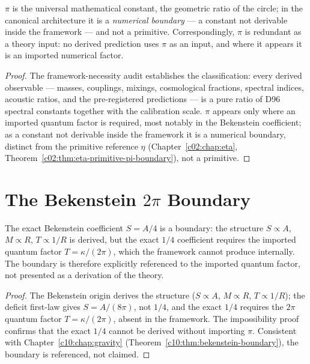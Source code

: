 \begin{theorem}
\label{c13:thm:pi-redundant}
\emph{$\pi$} is the universal mathematical constant, the geometric ratio of the circle; in
the canonical architecture it is a \emph{numerical boundary} --- a constant not derivable
inside the framework --- and not a primitive. Correspondingly, $\pi$ is redundant as a
theory input: no derived prediction uses $\pi$ as an input, and where it appears it is an
imported numerical factor.
\end{theorem}

\begin{proof}
The framework-necessity audit \cite{c13:QG291} establishes the classification: every derived
observable --- masses, couplings, mixings, cosmological fractions, spectral indices,
acoustic ratios, and the pre-registered predictions --- is a pure ratio of D96 spectral
constants together with the calibration scale. $\pi$ appears only where an imported quantum
factor is required, most notably in the Bekenstein coefficient; as a constant not derivable
inside the framework it is a numerical boundary, distinct from the primitive reference
$\eta$ (Chapter~\ref{c02:chap:eta}, Theorem~\ref{c02:thm:eta-primitive-pi-boundary}), not a
primitive.
\end{proof}

\section{The Bekenstein \texorpdfstring{$2\pi$}{2pi} Boundary}
\label{c13:sec:bekenstein}

\begin{theorem}
\label{c13:thm:bekenstein-2pi}
The exact Bekenstein coefficient $S = A/4$ is a boundary: the structure $S \propto A$,
$M \propto R$, $T \propto 1/R$ is derived, but the exact $1/4$ coefficient requires the
imported quantum factor $T = \kappa/(2\pi)$, which the framework cannot produce internally.
The boundary is therefore explicitly referenced to the imported quantum factor, not
presented as a derivation of the theory.
\end{theorem}

\begin{proof}
The Bekenstein origin \cite{c13:QG185} derives the structure ($S \propto A$, $M \propto R$,
$T \propto 1/R$); the deficit first-law gives $S = A/(8\pi)$, not $1/4$, and the exact $1/4$
requires the $2\pi$ quantum factor $T = \kappa/(2\pi)$, absent in the framework. The
impossibility proof \cite{c13:QG196} confirms that the exact $1/4$ cannot be derived without
importing $\pi$. Consistent with Chapter~\ref{c10:chap:gravity}
(Theorem~\ref{c10:thm:bekenstein-boundary}), the boundary is referenced, not claimed.
\end{proof}

